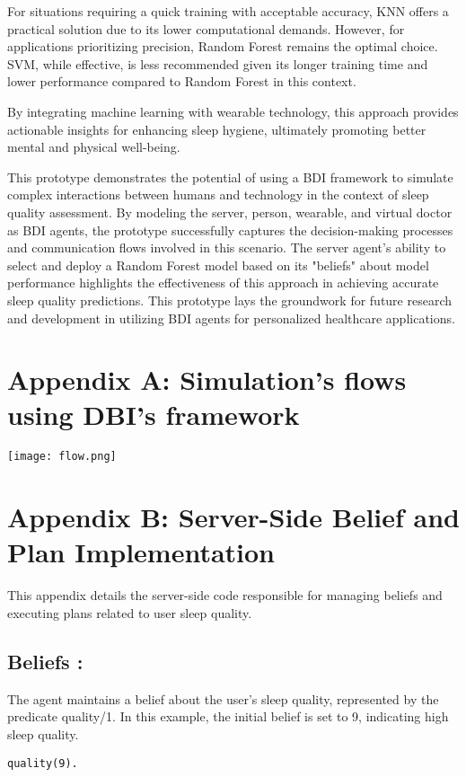 \documentclass[conference]{IEEEtran}
\begin{document}
For situations requiring a quick training with acceptable accuracy, KNN offers a practical solution due to its lower computational demands. However, for applications prioritizing precision, Random Forest remains the optimal choice. SVM, while effective, is less recommended given its longer training time and lower performance compared to Random Forest in this context.

By integrating machine learning with wearable technology, this approach provides actionable insights for enhancing sleep hygiene, ultimately promoting better mental and physical well-being.

This prototype demonstrates the potential of using a BDI framework to simulate complex interactions between humans and technology in the context of sleep quality assessment. By modeling the server, person, wearable, and virtual doctor as BDI agents, the prototype successfully captures the decision-making processes and communication flows involved in this scenario. The server agent's ability to select and deploy a Random Forest model based on its "beliefs" about model performance highlights the effectiveness of this approach in achieving accurate sleep quality predictions. This prototype lays the groundwork for future research and development in utilizing BDI agents for personalized healthcare applications.




\newpage %
\section*{Appendix A: Simulation's flows using DBI's framework}

\texttt{[image: flow.png]}
\newpage %

\section*{Appendix B: Server-Side Belief and Plan Implementation}

This appendix details the server-side code responsible for managing beliefs and executing plans related to user sleep quality.

\subsection*{Beliefs :}

The agent maintains a belief about the user's sleep quality, represented by the predicate quality/1. In this example, the initial belief is set to 9, indicating high sleep quality.
\begin{verbatim}
quality(9).  
\end{verbatim}
\end{document}

